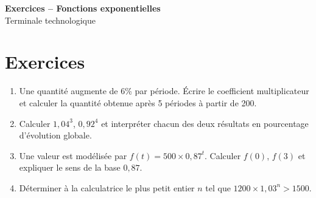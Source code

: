 \documentclass[french,11pt]{book}
\begin{document}
\begin{center}
{\Large \textbf{Exercices -- Fonctions exponentielles}}\\[2mm]
Terminale technologique
\end{center}

\section*{Exercices}
\begin{enumerate}
  \item Une quantité augmente de 6\% par période. Écrire le coefficient multiplicateur et calculer la quantité obtenue après 5 périodes à partir de 200.
  \item Calculer $1,04^3$, $0,92^4$ et interpréter chacun des deux résultats en pourcentage d'évolution globale.
  \item Une valeur est modélisée par $f(t)=500\times 0,87^t$. Calculer $f(0)$, $f(3)$ et expliquer le sens de la base $0,87$.
  \item Déterminer à la calculatrice le plus petit entier $n$ tel que $1200\times 1,03^n>1500$.
\end{enumerate}
\end{document}
